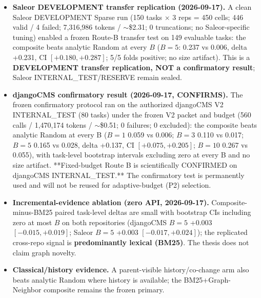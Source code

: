 \documentclass[11pt,a4paper]{article}
\begin{document}
\begin{itemize}
        above the analytic-Random baseline across the whole budget curve
        $B \in \{1,3,5,10\}$, with task-level bootstrap intervals excluding
        zero at every point (e.g.\ at $B{=}5$: pooled macro recovery 0.163 vs
        random 0.029, interval $[+0.09,+0.18]$), 5/5 development folds
        positive, and no omitted/universe-size artifact. A small verifier
        pilot (30 calls, $\sim$\$0.002) found the frozen ranker places the
        recoverable missed files within the top-$B$ (Oracle-in-top-$B$
        $\approx$ 1.0) and the verifier recovers $\sim$0.86--1.0 of them, so
        the dominant loss is first-pass omission.
  \item \textbf{Saleor DEVELOPMENT transfer replication (2026-09-17).} A clean
        Saleor DEVELOPMENT Sparse run (150 tasks $\times$ 3 reps = 450 cells;
        446 valid / 4 failed; 7,316,986 tokens / $\sim$\$2.31; 0 truncations;
        no Saleor-specific tuning) enabled a frozen Route-B transfer test on
        149 evaluable tasks: the composite beats analytic Random at every
        $B$ ($B{=}5$: 0.237 vs 0.006, delta +0.231, CI
        $[+0.180,+0.287]$; 5/5 folds positive; no size artifact). This is a
        \textbf{DEVELOPMENT transfer replication, NOT a confirmatory result};
        Saleor INTERNAL\_TEST/RESERVE remain sealed.
  \item \textbf{djangoCMS confirmatory result (2026-09-17, CONFIRMS).} The
        frozen confirmatory protocol ran on the authorized djangoCMS V2
        INTERNAL\_TEST (80 tasks) under the frozen V2 packet and budget
        (560 calls / 1,470,174 tokens / $\sim$\$0.51; 0 failures; 0 excluded):
        the composite beats analytic Random at every B ($B{=}1$ 0.059 vs
        0.006; $B{=}3$ 0.110 vs 0.017; $B{=}5$ 0.165 vs 0.028, delta +0.137,
        CI $[+0.075,+0.205]$; $B{=}10$ 0.267 vs 0.055), with task-level
        bootstrap intervals excluding zero at every B and no size artifact.
        **Fixed-budget Route B is scientifically CONFIRMED on djangoCMS
        INTERNAL\_TEST.** The confirmatory test is permanently used and will
        not be reused for adaptive-budget (P2) selection.
  \item \textbf{Incremental-evidence ablation (zero API, 2026-09-17).}
        Composite-minus-BM25 paired task-level deltas are small with bootstrap
        CIs including zero at most $B$ on both repositories (djangoCMS
        $B{=}5$ +0.003 $[-0.015,+0.019]$; Saleor $B{=}5$ +0.003
        $[-0.017,+0.024]$); the replicated cross-repo signal is
        \textbf{predominantly lexical (BM25)}. The thesis does not claim graph
        novelty.
  \item \textbf{Classical/history evidence.} A parent-visible history/co-change
        arm also beats analytic Random where history is available; the
        BM25+Graph-Neighbor composite remains the frozen primary.
\end{itemize}
\end{document}
